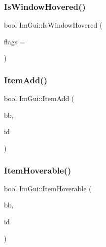 \hypertarget{namespace_im_gui_aaed1ebf40cc2cb2ec30b0ba39b91d4a5}{}\label{namespace_im_gui_aaed1ebf40cc2cb2ec30b0ba39b91d4a5} 
\subsubsection{\texorpdfstring{Is\+Window\+Hovered()}{IsWindowHovered()}}
{\footnotesize\ttfamily bool Im\+Gui\+::\+Is\+Window\+Hovered (\begin{DoxyParamCaption}\item[{Im\+Gui\+Hovered\+Flags}]{flags = {} }\end{DoxyParamCaption})}

\hypertarget{namespace_im_gui_a454e81b7c3befcc51c900f2fb3bd5a9a}{}\label{namespace_im_gui_a454e81b7c3befcc51c900f2fb3bd5a9a} 
\subsubsection{\texorpdfstring{Item\+Add()}{ItemAdd()}}
{\footnotesize\ttfamily bool Im\+Gui\+::\+Item\+Add (\begin{DoxyParamCaption}\item[{const \hyperlink{struct_im_rect}{Im\+Rect} \&}]{bb,  }\item[{Im\+Gui\+ID}]{id }\end{DoxyParamCaption})}

\hypertarget{namespace_im_gui_a488b86a9f235923304186fb86ff64ffb}{}\label{namespace_im_gui_a488b86a9f235923304186fb86ff64ffb} 
\subsubsection{\texorpdfstring{Item\+Hoverable()}{ItemHoverable()}}
{\footnotesize\ttfamily bool Im\+Gui\+::\+Item\+Hoverable (\begin{DoxyParamCaption}\item[{const \hyperlink{struct_im_rect}{Im\+Rect} \&}]{bb,  }\item[{Im\+Gui\+ID}]{id }\end{DoxyParamCaption})}

\hypertarget{namespace_im_gui_ac7b9a7399d9606b25278002303f545b6}{}\label{namespace_im_gui_ac7b9a7399d9606b25278002303f545b6} 
